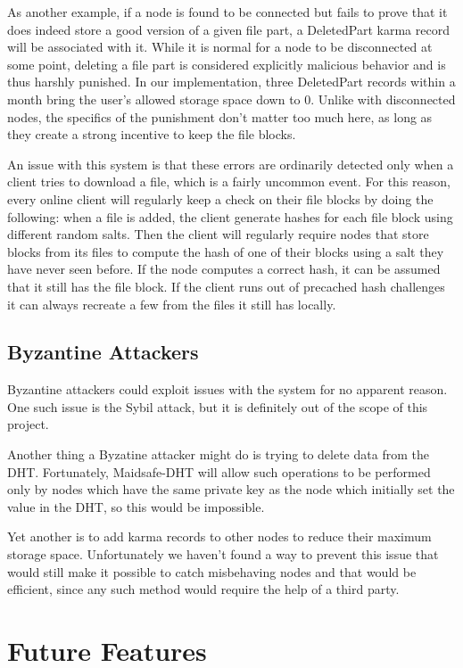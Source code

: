 \documentclass[11pt]{IEEEtran}
\begin{document}
As another example, if a node is found to be connected but fails to prove that it does indeed store a good version of a given file part, a DeletedPart karma record will be associated with it. While it is normal for a node to be disconnected at some point, deleting a file part is considered explicitly malicious behavior and is thus harshly punished. In our implementation, three DeletedPart records within a month bring the user's allowed storage space down to 0. Unlike with disconnected nodes, the specifics of the punishment don't matter too much here, as long as they create a strong incentive to keep the file blocks.

An issue with this system is that these errors are ordinarily detected only when a client tries to download a file, which is a fairly uncommon event. For this reason, every online client will regularly keep a check on their file blocks by doing the following: when a file is added, the client generate hashes for each file block using different random salts. Then the client will regularly require nodes that store blocks from its files to compute the hash of one of their blocks using a salt they have never seen before. If the node computes a correct hash, it can be assumed that it still has the file block. If the client runs out of precached hash challenges it can always recreate a few from the files it still has locally.

\subsection{Byzantine Attackers}

Byzantine attackers could exploit issues with the system for no apparent reason. One such issue is the Sybil attack\cite{sybil}, but it is definitely out of the scope of this project. 

Another thing a Byzatine attacker might do is trying to delete data from the DHT. Fortunately, Maidsafe-DHT will allow such operations to be performed only by nodes which have the same private key as the node which initially set the value in the DHT, so this would be impossible.

Yet another is to add karma records to other nodes to reduce their maximum storage space. Unfortunately we haven't found a way to prevent this issue that would still make it possible to catch misbehaving nodes and that would be efficient, since any such method would require the help of a third party.

\section{Future Features}
\end{document}
